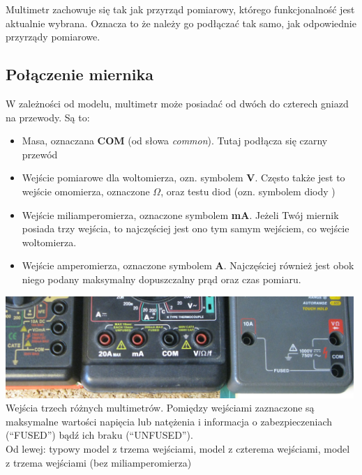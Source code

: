 Multimetr zachowuje się tak jak przyrząd pomiarowy, którego funkcjonalność jest aktualnie wybrana. Oznacza to że należy go podłączać
tak samo, jak odpowiednie przyrządy pomiarowe. 

\subsection{Połączenie miernika}
W zależności od modelu, multimetr może posiadać od dwóch do czterech gniazd na przewody. Są to:
\begin{itemize}
\item Masa, oznaczana \textbf{COM} (od słowa \textit{common}). Tutaj podłącza się czarny przewód
\item Wejście pomiarowe dla woltomierza, ozn. symbolem \textbf{V}. Często także jest to wejście omomierza, oznaczone \textbf{$\Omega$},
  oraz testu diod (ozn. symbolem diody )
\item Wejście miliamperomierza, oznaczone symbolem \textbf{mA}. Jeżeli Twój miernik posiada trzy wejścia, to najczęściej jest ono
  tym samym wejściem, co wejście woltomierza.
\item Wejście amperomierza, oznaczone symbolem \textbf{A}. Najczęściej również jest obok niego podany maksymalny dopuszczalny prąd
  oraz czas pomiaru.
\end{itemize}

\begin{Ramka}{}\begin{center}
  {\noindent\includegraphics[width=0.99\textwidth,clip=true]{warsztat_elektroniczny/dmm_terminals}}\\
  \small
  Wejścia trzech różnych multimetrów. Pomiędzy wejściami zaznaczone są maksymalne wartości napięcia lub natężenia i informacja o zabezpieczeniach  (``FUSED'') bądź ich braku (``UNFUSED'').\\
  Od lewej: typowy model z trzema wejściami, model z czterema wejściami, model z trzema wejściami (bez miliamperomierza)
\end{center}\end{Ramka}

